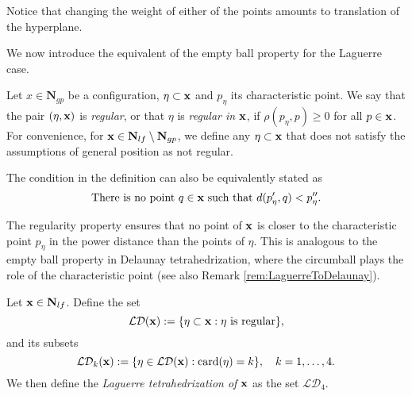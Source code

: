 Notice that changing the weight of either of the points amounts to translation of the hyperplane. \newline

\noindent We now introduce the equivalent of the empty ball property for the Laguerre case.


\begin{definition}\label{def:regular}
	Let $x\in \mathbf N_{gp}$ be a configuration, $\eta \subset {\mathbf{x}}$ and $p_\eta$ its characteristic point. We say that the pair $(\eta,{\mathbf{x}})$ is \textit{regular}, or that $\eta$ is \textit{regular in} ${\mathbf{x}}$, if $\rho(p_\eta,p)\geq 0$ for all $p\in{\mathbf{x}}$.	
	For convenience, for ${\mathbf{x}} \in \mathbf N_{lf}\setminus \mathbf N_{gp}$, we define any $\eta\subset {\mathbf{x}}$ that does not satisfy the assumptions of general position as not regular.
\end{definition}
The condition in the definition can also be equivalently stated as 
\begin{equation}\label{eq:equivregular}\text{There is no point } q\in{\mathbf{x}} \text{ such that } d(p'_\eta,q)<p''_\eta.\end{equation}

The regularity property ensures that no point of ${\mathbf{x}}$ is closer to the characteristic point $p_\eta$ in the power distance than the points of $\eta$. This is analogous to the empty ball property in Delaunay tetrahedrization, where the circumball plays the role of the characteristic point (see also Remark \ref{rem:LaguerreToDelaunay}).




\begin{definition}\label{def:Laguerre}
	Let ${\mathbf{x}} \in \mathbf N_{lf}$. Define the set 
	$$\mathcal {LD}({\mathbf{x}}) := \{\eta\subset {\mathbf{x}}: \eta \text{ is regular}\},$$
	and its subsets
	$$\mathcal {LD}_k({\mathbf{x}}) := \{\eta \in \mathcal {LD}({\mathbf{x}}): \mathrm{card}(\eta)=k \},\quad k = 1,\dots,4.$$
	We then define the \textit{Laguerre tetrahedrization of ${\mathbf{x}}$} as the set $\mathcal {LD}_4$. 
\end{definition}


